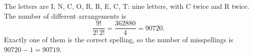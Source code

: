 The letters are I, N, C, O, R, R, E, C, T: nine letters, with C twice and R twice. The number of different arrangements is
\[\dfrac{9!}{2!\,2!}=\dfrac{362880}{4}=90720.\]
Exactly one of them is the correct spelling, so the number of misspellings is $90720-1=\boxed{90719}$.
